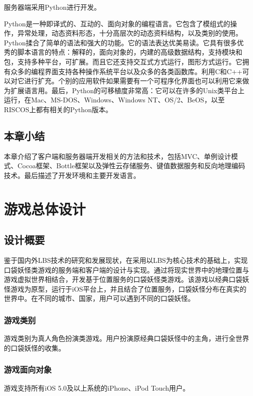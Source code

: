 \documentclass{article}
\begin{document}
\begin{CJK}{UTF8}{gbsn}
  服务器端采用Python进行开发。

  Python是一种即译式的、互动的、面向对象的编程语言。它包含了模组式的操作，异常处理，动态资料形态，十分高层次的动态资料结构，以及类别的使用。Python揉合了简单的语法和强大的功能。它的语法表达优美易读。它具有很多优秀的脚本语言的特点：解释的，面向对象的，内建的高级数据结构，支持模块和包，支持多种平台，可扩展。而且它还支持交互式方式运行，图形方式运行。它拥有众多的编程界面支持各种操作系统平台以及众多的各类函数库。利用C和C++可以对它进行扩充。个别的应用软件如果需要有一个可程序化界面也可以利用它来做为扩展语言用。最后，Python的可移植度非常高：它可以在许多的Unix类平台上运行，在Mac、MS-DOS、Windows、Windows NT、OS/2、BeOS，以至RISCOS上都有相关的Python版本。\cite{B05}

	\subsection{本章小结}
  本章介绍了客户端和服务器端开发相关的方法和技术，包括MVC、单例设计模式、Cocoa框架、Bottle框架以及弹性云存储服务、键值数据服务和反向地理编码技术。最后描述了开发环境和主要开发语言。


	\section{游戏总体设计}
	\subsection{设计概要}
  鉴于国内外LBS技术的研究和发展现状，在采用以LBS为核心技术的基础上，实现口袋妖怪类游戏的服务端和客户端的设计与实现。通过将现实世界中的地理位置与游戏虚拟世界相结合，开发基于位置服务的口袋妖怪类游戏。该游戏以经典口袋妖怪游戏为原型，运行于iOS平台上，并且结合了位置服务，口袋妖怪分布在真实的世界中。在不同的城市、国家，用户可以遇到不同的口袋妖怪。

	\subsubsection{游戏类别}
  游戏类别为真人角色扮演类游戏。用户扮演原经典口袋妖怪中的主角，进行全世界的口袋妖怪的收集。

	\subsubsection{游戏面向对象}
  游戏支持所有iOS 5.0及以上系统的iPhone、iPod Touch用户。


\end{CJK}
\end{document}
